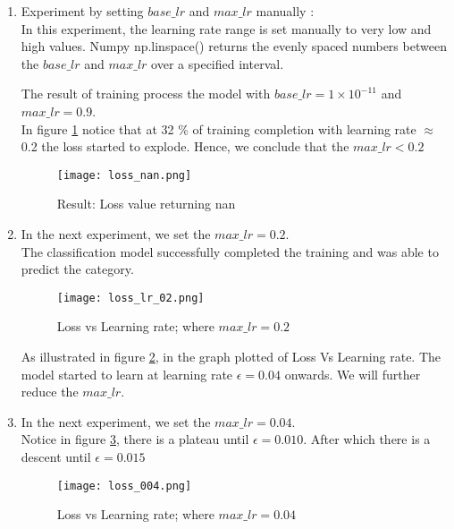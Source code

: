 \begin{enumerate}
    \item Experiment by setting $base\_lr$ and $max\_lr$  manually : \\
    In this experiment, the learning rate range is set manually to very low and high values. Numpy np.linspace() \parencite{harris2020array} returns the evenly spaced numbers between the  $base\_lr$ and $max\_lr$ over a specified interval.

    The result of training process the model with $base\_lr =1 \times 10^{-11}$ and $max\_lr=0.9$.\\
    In figure \ref{fig:Loss value} notice that at 32 \% of training completion with learning rate $\approx$ 0.2 the loss started to explode. Hence, we conclude that the  $max\_lr < 0.2$

    \begin{figure}[H]
        \centering    
        \texttt{[image: loss\_nan.png]}
        \caption{Result: Loss value returning nan}
        \label{fig:Loss value}
    \end{figure}


    \item In the next experiment, we set the $max\_lr = 0.2$. \\
    The classification model successfully completed the training and was able to predict the category.
    \begin{figure}[H]
        \centering    
        \texttt{[image: loss\_lr\_02.png]}
        \caption{Loss vs Learning rate; where $max\_lr = 0.2$}
        \label{fig:Loss value at 0.2}
    \end{figure}
    
    As illustrated in figure \ref{fig:Loss value at 0.2}, in the graph plotted of Loss Vs Learning rate. The model started to learn at learning rate $\epsilon = 0.04$ onwards. We will further reduce the $max\_lr$.

    \item In the next experiment, we set the $max\_lr = 0.04$. \\
    Notice in figure \ref{fig:Loss value at 0.04}, there is a plateau until $\epsilon = 0.010$. After which there is a descent until $\epsilon = 0.015$
    \begin{figure}[H]
        \centering    
        \texttt{[image: loss\_004.png]}
        \caption{Loss vs Learning rate; where $max\_lr = 0.04$}
        \label{fig:Loss value at 0.04}
    \end{figure}


\end{enumerate}
